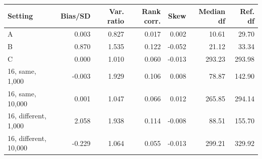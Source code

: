 \begin{tabular}{@{}lrrrrrr@{}}
\toprule
Setting & Bias/SD & Var. ratio & Rank corr. & Skew & Median df & Ref. df\\
\midrule
A & 0.003 & 0.827 & 0.017 & 0.002 & 10.61 & 29.70\\
B & 0.870 & 1.535 & 0.122 & -0.052 & 21.12 & 33.34\\
C & 0.000 & 1.010 & 0.060 & -0.013 & 293.23 & 293.98\\
16, same, 1,000 & -0.003 & 1.929 & 0.106 & 0.008 & 78.87 & 142.90\\
16, same, 10,000 & 0.001 & 1.047 & 0.066 & 0.012 & 265.85 & 294.14\\
16, different, 1,000 & 2.058 & 1.938 & 0.114 & -0.008 & 88.51 & 155.70\\
16, different, 10,000 & -0.229 & 1.064 & 0.055 & -0.013 & 299.21 & 329.92\\
\bottomrule
\end{tabular}
